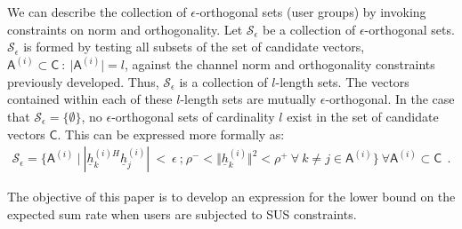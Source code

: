 We can describe the collection of $\epsilon$-orthogonal sets (user groups) by invoking constraints on norm and orthogonality. Let $\mathscr{S}_\epsilon$ be a collection of $\epsilon$-orthogonal sets. $\mathscr{S}_\epsilon$ is formed by testing all subsets of the set of candidate vectors, $\mathsf{A}^{(i)}\subset\mathsf{C}\ : \ \vert \mathsf{A}^{(i)} \vert = l$, against the channel norm and orthogonality constraints previously developed. Thus, $\mathscr{S}_\epsilon$ is a collection of $l$-length sets. The vectors contained within each of these $l$-length sets are mutually $\epsilon$-orthogonal. In the case that $\mathscr{S}_\epsilon = \lbrace \emptyset \rbrace$, no $\epsilon$-orthogonal sets of cardinality $l$ exist in the set of candidate vectors $\mathsf{C}$. This can be expressed more formally as:
 \begin{equation}\label{eq:S_e}
    \begin{aligned}
        \mathscr{S}_\epsilon = \lbrace \mathsf{A}^{(i)}\ \big|\ | \underline{h}_k^{(i)H}\underline{h}_j^{(i)} |\ <\ \epsilon \ \text{;} \ \rho^-<\Vert \underline{h}_k^{(i)} \Vert^2 < \rho^+\ \forall \ k \neq j \in \mathsf{A}^{(i)} \rbrace \ \forall \mathsf{A}^{(i)}\subset \mathsf{C} \ \ .
    \end{aligned}
\end{equation}

The objective of this paper is to develop an expression for the lower bound on the expected sum rate when users are subjected to SUS constraints.